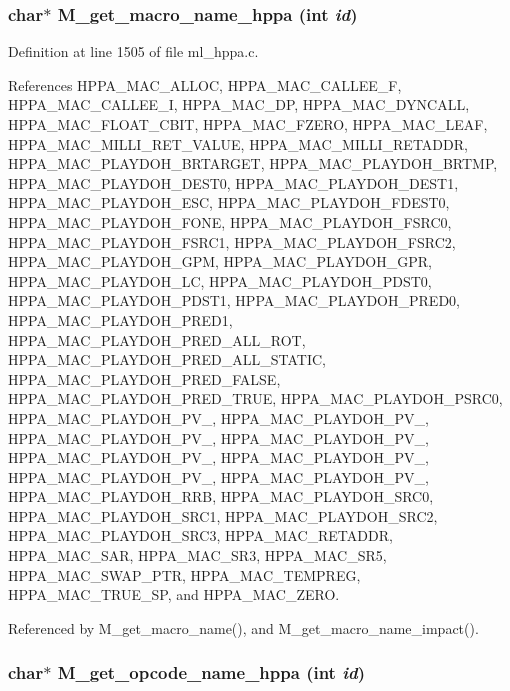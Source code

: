 \subsubsection{\setlength{\rightskip}{0pt plus 5cm}char$\ast$ M\_\-get\_\-macro\_\-name\_\-hppa (int {\em id})}\label{ml__hppa_8c_0b30cc81838e5a277738d6b057200aa3}




Definition at line 1505 of file ml\_\-hppa.c.

References HPPA\_\-MAC\_\-ALLOC, HPPA\_\-MAC\_\-CALLEE\_\-F, HPPA\_\-MAC\_\-CALLEE\_\-I, HPPA\_\-MAC\_\-DP, HPPA\_\-MAC\_\-DYNCALL, HPPA\_\-MAC\_\-FLOAT\_\-CBIT, HPPA\_\-MAC\_\-FZERO, HPPA\_\-MAC\_\-LEAF, HPPA\_\-MAC\_\-MILLI\_\-RET\_\-VALUE, HPPA\_\-MAC\_\-MILLI\_\-RETADDR, HPPA\_\-MAC\_\-PLAYDOH\_\-BRTARGET, HPPA\_\-MAC\_\-PLAYDOH\_\-BRTMP, HPPA\_\-MAC\_\-PLAYDOH\_\-DEST0, HPPA\_\-MAC\_\-PLAYDOH\_\-DEST1, HPPA\_\-MAC\_\-PLAYDOH\_\-ESC, HPPA\_\-MAC\_\-PLAYDOH\_\-FDEST0, HPPA\_\-MAC\_\-PLAYDOH\_\-FONE, HPPA\_\-MAC\_\-PLAYDOH\_\-FSRC0, HPPA\_\-MAC\_\-PLAYDOH\_\-FSRC1, HPPA\_\-MAC\_\-PLAYDOH\_\-FSRC2, HPPA\_\-MAC\_\-PLAYDOH\_\-GPM, HPPA\_\-MAC\_\-PLAYDOH\_\-GPR, HPPA\_\-MAC\_\-PLAYDOH\_\-LC, HPPA\_\-MAC\_\-PLAYDOH\_\-PDST0, HPPA\_\-MAC\_\-PLAYDOH\_\-PDST1, HPPA\_\-MAC\_\-PLAYDOH\_\-PRED0, HPPA\_\-MAC\_\-PLAYDOH\_\-PRED1, HPPA\_\-MAC\_\-PLAYDOH\_\-PRED\_\-ALL\_\-ROT, HPPA\_\-MAC\_\-PLAYDOH\_\-PRED\_\-ALL\_\-STATIC, HPPA\_\-MAC\_\-PLAYDOH\_\-PRED\_\-FALSE, HPPA\_\-MAC\_\-PLAYDOH\_\-PRED\_\-TRUE, HPPA\_\-MAC\_\-PLAYDOH\_\-PSRC0, HPPA\_\-MAC\_\-PLAYDOH\_\-PV\_, HPPA\_\-MAC\_\-PLAYDOH\_\-PV\_, HPPA\_\-MAC\_\-PLAYDOH\_\-PV\_, HPPA\_\-MAC\_\-PLAYDOH\_\-PV\_, HPPA\_\-MAC\_\-PLAYDOH\_\-PV\_, HPPA\_\-MAC\_\-PLAYDOH\_\-PV\_, HPPA\_\-MAC\_\-PLAYDOH\_\-PV\_, HPPA\_\-MAC\_\-PLAYDOH\_\-PV\_, HPPA\_\-MAC\_\-PLAYDOH\_\-RRB, HPPA\_\-MAC\_\-PLAYDOH\_\-SRC0, HPPA\_\-MAC\_\-PLAYDOH\_\-SRC1, HPPA\_\-MAC\_\-PLAYDOH\_\-SRC2, HPPA\_\-MAC\_\-PLAYDOH\_\-SRC3, HPPA\_\-MAC\_\-RETADDR, HPPA\_\-MAC\_\-SAR, HPPA\_\-MAC\_\-SR3, HPPA\_\-MAC\_\-SR5, HPPA\_\-MAC\_\-SWAP\_\-PTR, HPPA\_\-MAC\_\-TEMPREG, HPPA\_\-MAC\_\-TRUE\_\-SP, and HPPA\_\-MAC\_\-ZERO.

Referenced by M\_\-get\_\-macro\_\-name(), and M\_\-get\_\-macro\_\-name\_\-impact().
\subsubsection{\setlength{\rightskip}{0pt plus 5cm}char$\ast$ M\_\-get\_\-opcode\_\-name\_\-hppa (int {\em id})}\label{ml__hppa_8c_83e55e8fc37a7cf0577a46a663492b38}





